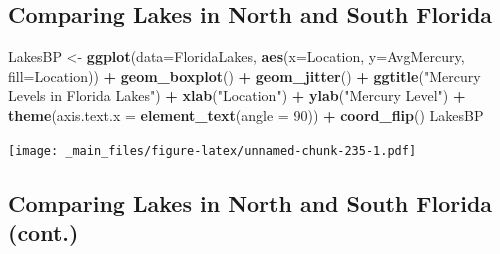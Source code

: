 \documentclass[]{book}
\newenvironment{Shaded}{\begin{snugshade}}{\end{snugshade}}
\newcommand{\KeywordTok}[1]{\textcolor[rgb]{0.13,0.29,0.53}{\textbf{#1}}}
\newcommand{\DataTypeTok}[1]{\textcolor[rgb]{0.13,0.29,0.53}{#1}}
\newcommand{\DecValTok}[1]{\textcolor[rgb]{0.00,0.00,0.81}{#1}}
\newcommand{\StringTok}[1]{\textcolor[rgb]{0.31,0.60,0.02}{#1}}
\newcommand{\OperatorTok}[1]{\textcolor[rgb]{0.81,0.36,0.00}{\textbf{#1}}}
\newcommand{\NormalTok}[1]{#1}
\begin{document}
\subsection{Comparing Lakes in North and South
Florida}\label{comparing-lakes-in-north-and-south-florida}

\begin{Shaded}
\begin{Highlighting}[]
\NormalTok{LakesBP <-}\StringTok{ }\KeywordTok{ggplot}\NormalTok{(}\DataTypeTok{data=}\NormalTok{FloridaLakes, }\KeywordTok{aes}\NormalTok{(}\DataTypeTok{x=}\NormalTok{Location, }\DataTypeTok{y=}\NormalTok{AvgMercury, }\DataTypeTok{fill=}\NormalTok{Location)) }\OperatorTok{+}\StringTok{ }
\StringTok{  }\KeywordTok{geom_boxplot}\NormalTok{() }\OperatorTok{+}\StringTok{   }\KeywordTok{geom_jitter}\NormalTok{() }\OperatorTok{+}\StringTok{ }\KeywordTok{ggtitle}\NormalTok{(}\StringTok{"Mercury Levels in Florida Lakes"}\NormalTok{) }\OperatorTok{+}\StringTok{ }
\StringTok{  }\KeywordTok{xlab}\NormalTok{(}\StringTok{"Location"}\NormalTok{) }\OperatorTok{+}\StringTok{ }\KeywordTok{ylab}\NormalTok{(}\StringTok{"Mercury Level"}\NormalTok{) }\OperatorTok{+}\StringTok{ }\KeywordTok{theme}\NormalTok{(}\DataTypeTok{axis.text.x =} \KeywordTok{element_text}\NormalTok{(}\DataTypeTok{angle =} \DecValTok{90}\NormalTok{)) }\OperatorTok{+}\StringTok{ }\KeywordTok{coord_flip}\NormalTok{()}
\NormalTok{LakesBP}
\end{Highlighting}
\end{Shaded}

\texttt{[image: \_main\_files/figure-latex/unnamed-chunk-235-1.pdf]}

\subsection{Comparing Lakes in North and South Florida
(cont.)}\label{comparing-lakes-in-north-and-south-florida-cont.}

\begin{Shaded}
\end{Shaded}
\end{document}
